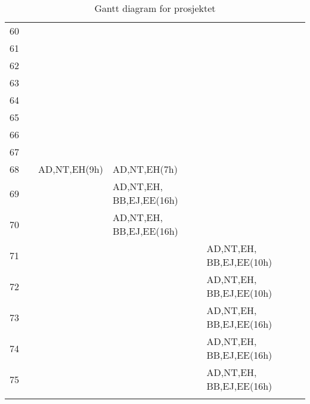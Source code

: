 \begin{longtable}[l]{|c|X|X|X|X|X|}
	60 	& 					& 					& 					&					\\ 
	61 	& 		 			& 					& 					& 					\\ 
	62 	& 					& 					& 					& 					\\ 
	63 	& 					& 					& 					&					\\ 	
	64 	& 					& 					& 					&					\\ 
	65 	& 		 			& 					& 					& 					\\ 
	66 	& 					& 					& 					& 					\\ 
	67 	& 					& 					& 					&					\\ 	
	68 	& 					& AD,NT,EH(9h)			& AD,NT,EH(7h)			&					\\ 
	69 	& 		 			& 					& AD,NT,EH, BB,EJ,EE(16h)& 					\\ 
	70 	& 					& 					& AD,NT,EH, BB,EJ,EE(16h)& 					\\ 
	71 	& 					& 					& 					& AD,NT,EH, BB,EJ,EE(10h)\\ 	
	72 	& 					& 					& 					& AD,NT,EH, BB,EJ,EE(10h)\\ 
	73 	& 		 			& 					& 					& AD,NT,EH, BB,EJ,EE(16h)\\ 
	74	& 					& 					& 					& AD,NT,EH, BB,EJ,EE(16h)\\ 	
	75 	& 					& 					& 					& AD,NT,EH, BB,EJ,EE(16h)\\ \hline
	\caption {Gantt diagram for prosjektet}
	\end{longtable}